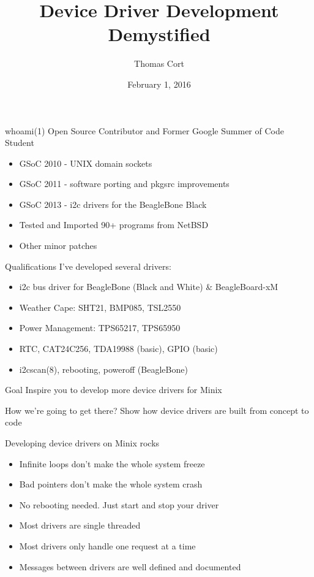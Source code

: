 \documentclass{beamer}
\begin{document}
\title{Device Driver Development Demystified}
\author{Thomas Cort}
\date{February 1, 2016}

\begin{frame}
\titlepage
\end{frame}

\begin{frame}{whoami(1)}
  Open Source Contributor and Former Google Summer of Code Student
  \begin{itemize}
  \item GSoC 2010 - UNIX domain sockets
  \item GSoC 2011 - software porting and pkgsrc improvements
  \item GSoC 2013 - i2c drivers for the BeagleBone Black
  \item Tested and Imported 90+ programs from NetBSD
  \item Other minor patches
  \end{itemize}
\end{frame}

\begin{frame}{Qualifications}
  I've developed several drivers:
  \begin{itemize}
  \item i2c bus driver for BeagleBone (Black and White) \& BeagleBoard-xM
  \item Weather Cape: SHT21, BMP085, TSL2550
  \item Power Management: TPS65217, TPS65950
  \item RTC, CAT24C256, TDA19988 (basic), GPIO (basic)
  \item i2cscan(8), rebooting, poweroff (BeagleBone)
  \end{itemize}
\end{frame}

\begin{frame}{Goal}
  \centering
  Inspire you to develop more device drivers for Minix
\end{frame}

\begin{frame}{How we're going to get there?}
  \centering
  Show how device drivers are built from concept to code
\end{frame}

\begin{frame}{Developing device drivers on Minix rocks}
  \begin{itemize}
  \item Infinite loops don't make the whole system freeze
  \item Bad pointers don't make the whole system crash
  \item No rebooting needed. Just start and stop your driver
  \item Most drivers are single threaded
  \item Most drivers only handle one request at a time
  \item Messages between drivers are well defined and documented
  \end{itemize}
\end{frame}
\end{document}
